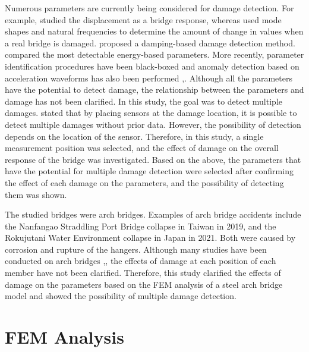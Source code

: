\documentclass{proc-a4}
\begin{document}
\noindent Numerous parameters are currently being considered for damage detection. For example,\citep{sekiya} studied the displacement as a bridge response, whereas \citep{kim} used mode shapes and natural frequencies to determine the amount of change in values when a real bridge is damaged. \citep{gensui} proposed a damping-based damage detection method. \citep{paramater} compared the most detectable energy-based parameters. More recently, parameter identification procedures have been black-boxed and anomaly detection based on acceleration waveforms has also been performed \citep{2020},\citep{2022}. Although all the parameters have the potential to detect damage, the relationship between the parameters and damage has not been clarified. In this study, the goal was to detect multiple damages. \citep{Lee} stated that by placing sensors at the damage location, it is possible to detect multiple damages without prior data. However, the possibility of detection depends on the location of the sensor. Therefore, in this study, a single measurement position was selected, and the effect of damage on the overall response of the bridge was investigated. Based on the above, the parameters that have the potential for multiple damage detection were selected after confirming the effect of each damage on the parameters, and the possibility of detecting them was shown.\\\noindent

\noindent The studied bridges were arch bridges. Examples of arch bridge accidents include the Nanfangao Straddling Port Bridge collapse in Taiwan in 2019, and the Rokujutani Water Environment collapse in Japan in 2021. Both were caused by corrosion and rupture of the hangers. Although many studies have been conducted on arch bridges \citep{arch1},\citep{arch2}, the effects of damage at each position of each member have not been clarified. Therefore, this study clarified the effects of damage on the parameters based on the FEM analysis of a steel arch bridge model and showed the possibility of multiple damage detection.

\section{FEM Analysis}
\end{document}
